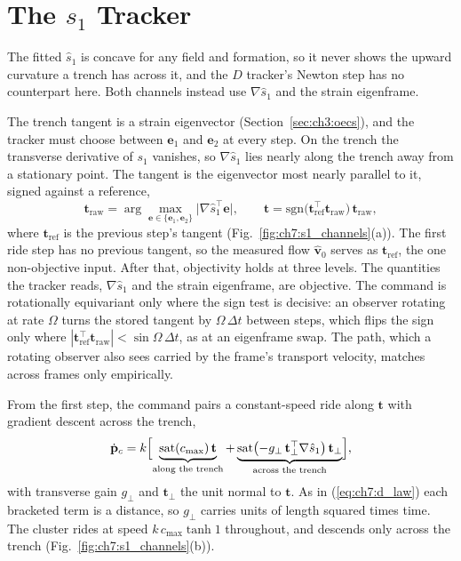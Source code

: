 \section{The $s_1$ Tracker}
\label{sec:ch7:s1_controller}

The fitted $\hat{s}_1$ is concave for any field and formation, so it
never shows the upward curvature a
trench has across it, and the $D$ tracker's Newton step has no counterpart
here. Both channels instead use $\nabla\hat{s}_1$ and the strain
eigenframe.

The trench tangent is a strain eigenvector (Section~\ref{sec:ch3:oecs}),
and the tracker must choose between $\mathbf{e}_1$ and $\mathbf{e}_2$ at
every step. On the trench the transverse derivative of $s_1$ vanishes, so
$\nabla\hat{s}_1$ lies nearly along the trench away from a stationary
point. The tangent is the eigenvector most nearly parallel to it, signed
against a reference,
\begin{equation}
    \mathbf{t}_{\mathrm{raw}} =
    \arg\max_{\mathbf{e} \in \{\mathbf{e}_1, \mathbf{e}_2\}}
    \bigl\lvert \nabla\hat{s}_1^\top \mathbf{e} \bigr\rvert,
    \qquad
    \mathbf{t} = \mathrm{sgn}\bigl(\mathbf{t}_{\mathrm{ref}}^\top
    \mathbf{t}_{\mathrm{raw}}\bigr)\,\mathbf{t}_{\mathrm{raw}},
    \label{eq:ch7:tangent_select}
\end{equation}
where $\mathbf{t}_{\mathrm{ref}}$ is the previous step's tangent
(Fig.~\ref{fig:ch7:s1_channels}(a)). The first ride step has no previous
tangent, so the measured flow $\hat{\mathbf{v}}_0$ serves as
$\mathbf{t}_{\mathrm{ref}}$, the one non-objective input. After that,
objectivity holds at three levels. The quantities the tracker reads,
$\nabla\hat{s}_1$ and the strain eigenframe, are objective. The command
is rotationally equivariant only where the sign test is decisive: an
observer rotating at rate $\Omega$ turns the stored tangent by
$\Omega\,\Delta t$ between steps, which flips the sign only where
\mbox{$|\mathbf{t}_{\mathrm{ref}}^\top\mathbf{t}_{\mathrm{raw}}| <
\sin\Omega\,\Delta t$}, as at an eigenframe swap. The path, which a
rotating observer also sees carried by the frame's transport velocity,
matches across frames only empirically.

From the first step, the command pairs a constant-speed ride along
$\mathbf{t}$ with gradient descent across the trench,
\begin{equation}
    \dot{\mathbf{p}}_c = k\Bigl[
    \underbrace{\mathrm{sat}(c_{\max})\,\mathbf{t}}_{\text{along the trench}}
    + \underbrace{\mathrm{sat}\bigl(-g_\perp\,\mathbf{t}_\perp^\top
      \nabla\hat{s}_1\bigr)\,\mathbf{t}_\perp}_{\text{across the trench}}\Bigr],
    \label{eq:ch7:s1_law}
\end{equation}
with transverse gain $g_\perp$ and $\mathbf{t}_\perp$ the unit normal to
$\mathbf{t}$. As in (\ref{eq:ch7:d_law}) each bracketed term is a distance, so
$g_\perp$ carries units of length squared times time. The cluster rides at
speed $k\,c_{\max}\tanh 1$ throughout, and descends only across the
trench (Fig.~\ref{fig:ch7:s1_channels}(b)).

